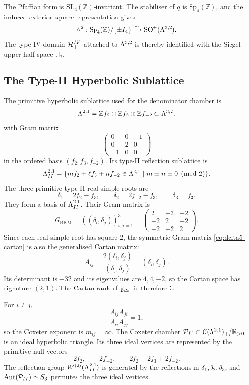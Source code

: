 The Pfaffian form is $\mathrm{SL}_4(\mathbb{Z})$-invariant.  The stabiliser
of $q$ is $\mathrm{Sp}_4(\mathbb{Z})$, and the induced exterior-square
representation gives
\[
\wedge^2:\mathrm{Sp}_4(\mathbb{Z})/\{\pm I_4\}
\xrightarrow{\sim}\mathrm{SO}^{+}(\Lambda^{3,2}).
\]
The type-IV domain $\mathcal{H}^{IV}_{+}$ attached to $\Lambda^{3,2}$ is thereby identified
with the Siegel upper half-space $\mathbb{H}_2$.

\subsection*{The Type-II Hyperbolic Sublattice}

The primitive hyperbolic sublattice used for the denominator chamber is
\[
\Lambda^{2,1}=\mathbb{Z}f_2\oplus\mathbb{Z}f_3\oplus\mathbb{Z}f_{-2}
\subset\Lambda^{3,2},
\]
with Gram matrix
\[
\begin{pmatrix}
0&0&-1\\
0&2&0\\
-1&0&0
\end{pmatrix}
\]
in the ordered basis $(f_2,f_3,f_{-2})$.  Its type-II reflection sublattice is
\[
\Lambda^{2,1}_{II}=\{m f_2+\ell f_3+n f_{-2}\in\Lambda^{2,1}\mid m\equiv n\equiv0
\pmod 2\}.
\]
The three primitive type-II real simple roots are
\begin{equation}
\delta_1=2f_2-f_3,\qquad
\delta_2=2f_{-2}-f_3,\qquad
\delta_3=f_3 .
\label{eq:delta5-real-simple-roots}
\end{equation}
They form a basis of $\Lambda^{2,1}_{II}$.  Their Gram matrix is
\begin{equation}
G_{\mathrm{BKM}}=((\delta_i,\delta_j))_{i,j=1}^{3}=
\begin{pmatrix}
2&-2&-2\\
-2&2&-2\\
-2&-2&2
\end{pmatrix}.
\label{eq:delta5-cartan}
\end{equation}
Since each real simple root has square $2$, the symmetric Gram matrix
\eqref{eq:delta5-cartan} is also the generalised Cartan matrix:
\[
A_{ij}=\frac{2(\delta_i,\delta_j)}{(\delta_j,\delta_j)}
=(\delta_i,\delta_j).
\]
Its determinant is $-32$ and its eigenvalues are $4,4,-2$, so the Cartan
space has signature $(2,1)$.  The Cartan rank of $\mathfrak{g}_{\Delta_5}$ is therefore $3$.

For $i\neq j$,
\[
\frac{A_{ij}A_{ji}}{A_{ii}A_{jj}}=1,
\]
so the Coxeter exponent is $m_{ij}=\infty$.  The Coxeter chamber
$\mathcal{P}_{II}\subset\mathcal{C}(\Lambda^{2,1})_+/\mathbb{R}_{>0}$ is an ideal hyperbolic
triangle.  Its three ideal vertices are represented by the primitive
null vectors
\[
2f_2,\qquad 2f_{-2},\qquad 2f_2-2f_3+2f_{-2}.
\]
The reflection group $W^{(2)}(\Lambda^{2,1}_{II})$ is generated by the reflections in
$\delta_1,\delta_2,\delta_3$, and $\mathrm{Aut}(\mathcal{P}_{II})\simeq S_3$ permutes
the three ideal vertices.

